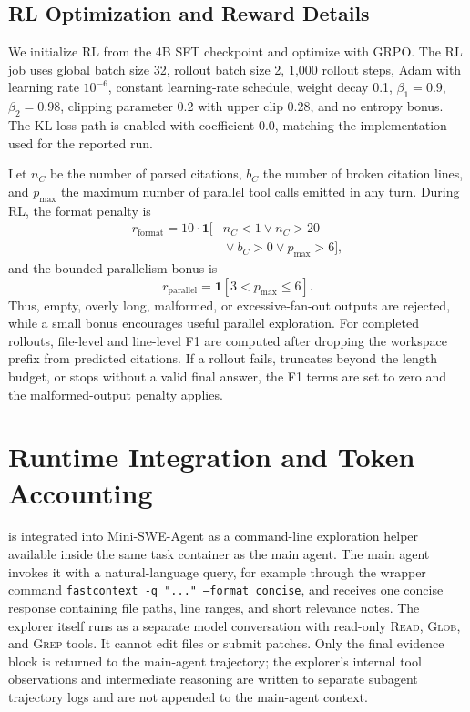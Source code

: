 \subsection{RL Optimization and Reward Details}
\label{app:reward-details}

We initialize RL from the 4B SFT checkpoint and optimize with GRPO.
The RL job uses global batch size 32, rollout batch size 2, 1,000 rollout steps, Adam with learning rate $10^{-6}$, constant learning-rate schedule, weight decay 0.1, $\beta_1=0.9$, $\beta_2=0.98$, clipping parameter 0.2 with upper clip 0.28, and no entropy bonus.
The KL loss path is enabled with coefficient 0.0, matching the implementation used for the reported run.

Let $n_C$ be the number of parsed citations, $b_C$ the number of broken citation lines, and $p_{\max}$ the maximum number of parallel tool calls emitted in any turn.
During RL, the format penalty is
\begin{equation}
\begin{aligned}
r_{\mathrm{format}}
= 10 \cdot \mathbf{1}[{}&n_C < 1 \lor n_C > 20 \\
&{}\lor b_C > 0 \lor p_{\max} > 6],
\end{aligned}
\end{equation}
and the bounded-parallelism bonus is
\begin{equation}
r_{\mathrm{parallel}}
= \mathbf{1}[3 < p_{\max} \le 6].
\end{equation}
Thus, empty, overly long, malformed, or excessive-fan-out outputs are rejected, while a small bonus encourages useful parallel exploration.
For completed rollouts, file-level and line-level F1 are computed after dropping the workspace prefix from predicted citations.
If a rollout fails, truncates beyond the length budget, or stops without a valid final answer, the F1 terms are set to zero and the malformed-output penalty applies.

\section{Runtime Integration and Token Accounting}
\label{app:runtime-accounting}

\approach is integrated into Mini-SWE-Agent as a command-line exploration helper available inside the same task container as the main agent.
The main agent invokes it with a natural-language query, for example through the wrapper command \texttt{fastcontext -q "..." --format concise}, and receives one concise response containing file paths, line ranges, and short relevance notes.
The explorer itself runs as a separate model conversation with read-only \textsc{Read}, \textsc{Glob}, and \textsc{Grep} tools.
It cannot edit files or submit patches.
Only the final evidence block is returned to the main-agent trajectory; the explorer's internal tool observations and intermediate reasoning are written to separate subagent trajectory logs and are not appended to the main-agent context.

